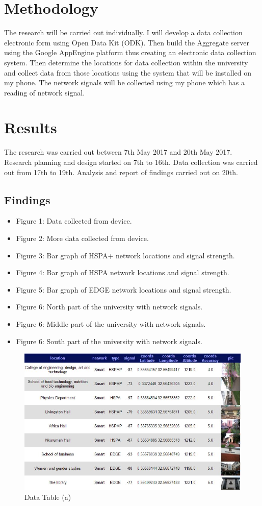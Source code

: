 \documentclass{article}
\begin{document}
\section{Methodology}
The research will be carried out individually. I will develop a data collection electronic form using Open Data Kit (ODK). Then build the Aggregate server using the Google AppEngine platform thus creating an electronic data collection system. Then determine the locations for data collection within the university and collect data from those locations using the system that will be installed on my phone. The network signals will be collected using my phone which has a reading of network signal.

\section{Results}
The research was carried out between 7th May 2017 and 20th May 2017. Research planning and design started on 7th to 16th. Data collection was carried out from 17th to 19th. Analysis and report of findings carried out on 20th.

\subsection{Findings}
\begin{itemize}
\item
Figure 1: Data collected from device.
\item
Figure 2: More data collected from device.
\item
Figure 3: Bar graph of HSPA+  network locations and signal strength.
\item
Figure 4: Bar graph of HSPA  network locations and signal strength.
\item
Figure 5: Bar graph of EDGE  network locations and signal strength.
\item
Figure 6: North part of the university with network signals.
\item
Figure 6: Middle part of the university with network signals.
\item
Figure 6: South part of the university with network signals.
\end{itemize}
	
\begin{figure}
  \includegraphics[width=\linewidth]{tableone.jpg}
  \caption{Data Table (a)}
  \label{fig:dt1}
\end{figure}
\end{document}
